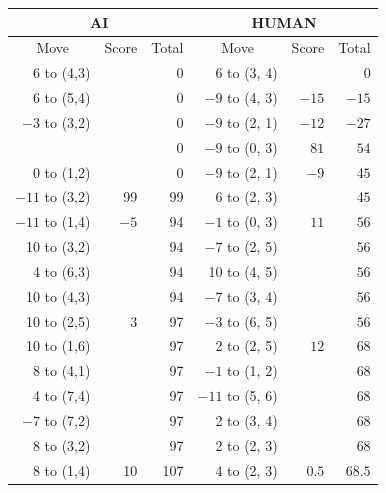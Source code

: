 \begin{appendices}
\begin{table}[H]
    \centering
    \begin{tabular}{rrrrrr}
        \hline
        \multicolumn{3}{c}{AI}        & \multicolumn{3}{c}{HUMAN}     \\ \hline
        \multicolumn{1}{c}{Move}         & \multicolumn{1}{c}{Score} & \multicolumn{1}{c}{Total} & \multicolumn{1}{c}{Move}         & \multicolumn{1}{c}{Score} & \multicolumn{1}{c}{Total} \\ \hline
          6 to (4,3) &      &  0    &   6 to (3, 4) &      &  0    \\ \hline
          6 to (5,4) &      &  0    &   $-9$ to (4, 3) &  $-15$    &  $-15$    \\ \hline
          $-3$ to (3,2) &      &  0    &   $-9$ to (2, 1) &  $-12$    &  $-27$    \\ \hline
                      &      &  0    &   $-9$ to (0, 3) &  $81$    &  $54$    \\ \hline
          0 to (1,2) &      &  0    &   $-9$ to (2, 1) &  $-9$    &  $45$    \\ \hline
         $-11$ to (3,2) &  99  &  99    &   6 to (2, 3) &      &  $45$    \\ \hline
         $-11$ to (1,4) &  $-5$   &  94    &   $-1$ to (0, 3) &  $11$    &  $56$    \\ \hline
          10 to (3,2) &     &  94    &   $-7$ to (2, 5) &      &  $56$    \\ \hline
          4 to (6,3) &      &  94    &   10 to (4, 5) &      &  $56$    \\ \hline
          10 to (4,3) &      &  94    &   $-7$ to (3, 4) &      &  $56$    \\ \hline
          10 to (2,5) &  3    &  97    &   $-3$ to (6, 5) &      &  $56$    \\ \hline
          10 to (1,6) &      &  97    &   2 to (2, 5) &  $12$    &  $68$    \\ \hline
          8 to (4,1) &      &  97    &   $-1$ to (1, 2) &      &  $68$    \\ \hline
          4 to (7,4) &      &  97    &   $-11$ to (5, 6) &      &  $68$    \\ \hline
          $-7$ to (7,2) &      &  97    &   2 to (3, 4) &      &  $68$    \\ \hline
          8 to (3,2) &      &  97    &   2 to (2, 3) &      &  $68$    \\ \hline
          8 to (1,4) &  10    &  107    &   4 to (2, 3) &  $0.5$    &  $68.5$    \\ \hline

\end{tabular}
\end{table}
\end{appendices}
